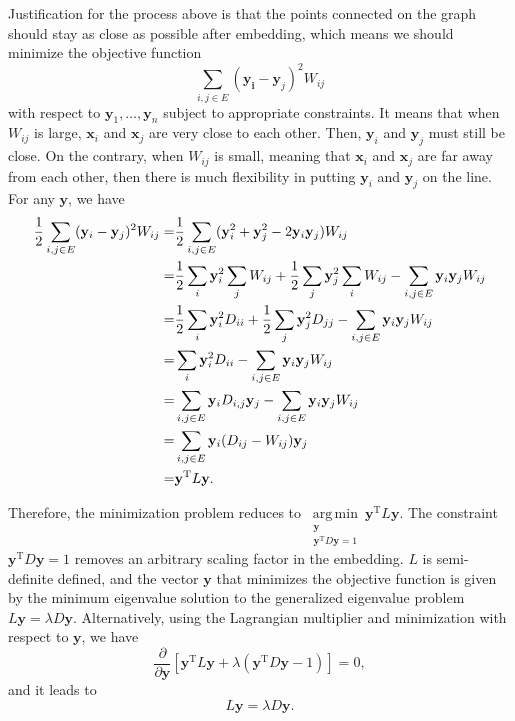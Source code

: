 Justification for the process above is that the points connected on the graph should stay as close as possible after embedding, which means we should minimize the objective function
\begin{equation}
	\sum_{i,j\in E}(\mathbf{y_i}-\mathbf{y}_j)^2W_{ij}
\end{equation}
with respect to $\mathbf{y}_1, \dots, \mathbf{y}_n$ subject to appropriate constraints. It means that when $W_{ij}$ is large, $\mathbf{x}_i$ and $\mathbf{x}_j$ are very close to each other. Then, $\mathbf{y}_i$ and $\mathbf{y}_j$ must still be close. On the contrary, when $W_{ij}$ is small, meaning that $\mathbf{x}_i$ and $\mathbf{x}_j$ are far away from each other, then there is much flexibility in putting $\mathbf{y}_i$ and $\mathbf{y}_j$ on the line. For any $\mathbf{y}$, we have
\begin{align}
	\frac{1}{2}\sum_{i,j\in E}(\mathbf{y}_i-\mathbf{y}_j)^2 W_{ij}=&\frac{1}{2}\sum_{i,j\in E}(\mathbf{y}_i^2+\mathbf{y}_j^2-2\mathbf{y}_i\mathbf{y}_j)W_{ij}\notag\\
	=&\frac{1}{2}\sum_{i}\mathbf{y}_i^2\sum_j W_{ij}+\frac{1}{2}\sum_j \mathbf{y}_j^2\sum_i W_{ij}-\sum_{i,j\in E}\mathbf{y}_i\mathbf{y}_j W_{ij}\notag\\
	=&\frac{1}{2}\sum_{i}\mathbf{y}_i^2 D_{ii}+\frac{1}{2}\sum_j \mathbf{y}_j^2 D_{jj}-\sum_{i,j\in E}\mathbf{y}_i\mathbf{y}_j W_{ij}\notag\\
	=&\sum_i \mathbf{y}_i^2D_{ii} -\sum_{i,j\in E}\mathbf{y}_i\mathbf{y}_jW_{ij}\notag\\
	=&\sum_{i,j\in E}\mathbf{y}_iD_{i,j}\mathbf{y}_j-\sum_{i,j\in E}\mathbf{y}_i\mathbf{y}_jW_{ij}\notag\\
	=&\sum_{i,j\in E}\mathbf{y}_i(D_{ij}-W_{ij})\mathbf{y}_j\notag\\
	=&\mathbf{y}^{\operatorname{T}}L\mathbf{y}.
\end{align}

Therefore, the minimization problem reduces to $\operatorname*{arg\,min}\limits_{\substack{\mathbf{y}\\\mathbf{y}^{\operatorname{T}}D\mathbf{y}=1}} \mathbf{y}^{\operatorname{T}}L\mathbf{y}$. The constraint $\mathbf{y}^{\operatorname{T}}D\mathbf{y}=1$ removes an arbitrary scaling factor in the embedding. $L$ is semi-definite defined, and the vector $\mathbf{y}$ that minimizes the objective function is given by the minimum eigenvalue solution to the generalized eigenvalue problem $L\mathbf{y}=\lambda D\mathbf{y}$. Alternatively, using the Lagrangian multiplier and minimization with respect to $\mathbf{y}$, we have
\begin{equation}
	\frac{\partial}{\partial \mathbf{y}}\left[\mathbf{y}^{\operatorname{T}}L\mathbf{y}+\lambda\left(\mathbf{y}^{\operatorname{T}}D\mathbf{y}-1\right)\right]=0,
\end{equation}
and it leads to
\begin{equation}
	L\mathbf{y}=\lambda D\mathbf{y}.
\end{equation}

